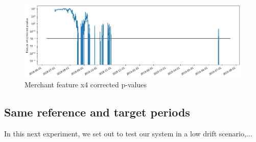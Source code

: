 \begin{figure}[!htb]
    \begin{center}
      \includegraphics[scale=0.5]{figures/merchant-x4-correctedpvalues.png}
      \caption{Merchant feature x4 corrected p-values}
      \label{fig:merchant-x4-correctedpvalues}
    \end{center}
\end{figure}




\subsection{Same reference and target periods}
In this next experiment, we set out to test our system in a low drift scenario,... 


